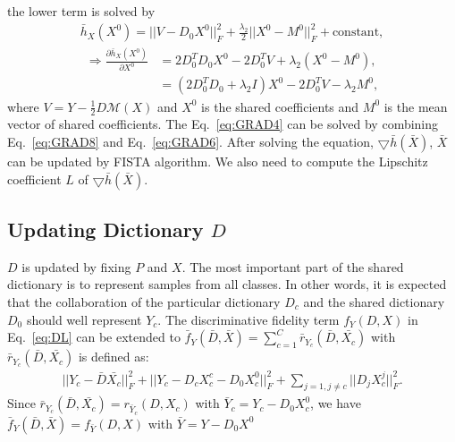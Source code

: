 the lower term is solved by 
\begin{equation}
\begin{aligned}
\bar{h}_X(X^0) = ||V-D_0X^0||_F^2 + \frac{\lambda_2}{2}||X^0 - M^0||_F^2 + \text{constant},
\end{aligned}
\label{eq:GRAD7}
\end{equation}
\begin{equation}
\begin{aligned}
\Rightarrow \frac{\partial \bar{h}_{X}(X^0)}{\partial X^0} & = 2D_0^TD_0X^0 - 2D_0^TV +\lambda_2(X^0 - M^0),\\
& = (2D_0^TD_0+\lambda_2I)X^0 - 2D_0^TV - \lambda_2M^0,
\end{aligned}
\label{eq:GRAD8}
\end{equation}
where $V = Y-\frac{1}{2}D\mathcal{M}(X)$ and $X^0$ is the shared coefficients and $M^0$ is the mean vector of shared coefficients. The Eq.~\eqref{eq:GRAD4} can be solved by combining Eq.~\eqref{eq:GRAD8} and Eq.~\eqref{eq:GRAD6}.
After solving the equation, $\bigtriangledown \bar{h}(\bar{X})$, $\bar{X}$ can be updated by FISTA algorithm. We also need to compute the Lipschitz coefficient $L$ of $\bigtriangledown \bar{h}(\bar{X})$.


\subsection*{Updating Dictionary $D$}

$D$ is updated by fixing $P$ and $X$. 
The most important part of the shared dictionary is to represent samples from all classes. In other words,
it is expected that the collaboration of the particular dictionary $D_c$ and the shared dictionary $D_0$ should well represent $Y_c$. 
 The discriminative fidelity term $f_Y(D,X)$ in Eq.~\eqref{eq:DL} can be extended to $\bar{f}_Y(\bar{D},\bar{X}) = \sum_{c=1}^{C}\bar{r}_{Y_c}(\bar{D},\bar{X_c})$ with $\bar{r}_{Y_c}(\bar{D},\bar{X_c})$ is defined as:
\begin{equation}
\begin{aligned}
||Y_c-\bar{D}\bar{X_{c}}||_F^2 + ||Y_c-D_c X_c^c-D_0X_c^0||_F^2 + \sum_{j=1,j\neq c} ||D_jX_c^j||_F^2.
\end{aligned}
\label{eq:DL0}
\end{equation}
Since $\bar{r}_{Y_c}(\bar{D},\bar{X_c}) = r_{\bar{Y}_c}(D,X_c)$ with $\bar{Y}_c = Y_c-D_0X_c^0$, we have $\bar{f}_Y(\bar{D},\bar{X}) = f_{\bar{Y}}(D,X)$ with $\bar{Y}=Y-D_0X^0$

